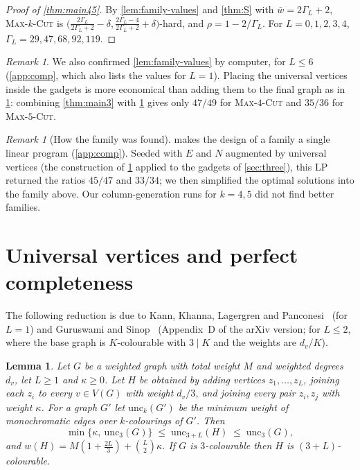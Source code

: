 \documentclass[11pt,letterpaper]{article}
\newtheorem{lemma}[theorem]{Lemma}
\theoremstyle{remark}
\newtheorem{remark}[theorem]{Remark}
\newcommand{\MC}[1]{\textup{\textsc{Max-$#1$-Cut}}}
\begin{document}
\begin{proof}[Proof of \cref{thm:main45}]
By \cref{lem:family-values} and \cref{thm:S} with $\bar w=2\Gamma_L+2$, \MC{k} is
$\big(\frac{2\Gamma_L}{2\Gamma_L+2}-\delta,\frac{2\Gamma_L-4}{2\Gamma_L+2}+\delta\big)$-hard, and
$\rho=1-2/\Gamma_L$. For $L=0,1,2,3,4$, $\Gamma_L=29,47,68,92,119$.
\end{proof}

\begin{remark}\label{rem:larger-k}
We also confirmed \cref{lem:family-values} by computer, for $L\le 6$ (\cref{app:comp}, which also lists
the values for $L=1$). Placing the universal vertices inside the gadgets is more economical than adding
them to the final graph as in \cref{sec:universal}: combining \cref{thm:main3} with \cref{lem:universal}
gives only $47/49$ for \MC{4} and $35/36$ for \MC{5}.
\end{remark}

\begin{remark}[How the family was found]
 makes the design of a family a single linear program (\cref{app:comp}). Seeded with $E$ and
$N$ augmented by universal vertices (the construction of \cref{sec:universal} applied to the gadgets of
\cref{sec:three}), this LP returned the ratios $45/47$ and $33/34$; we then simplified the optimal solutions
into the family above. Our column-generation runs for $k=4,5$ did not find better families.
\end{remark}

\section{Universal vertices and perfect completeness}\label{sec:universal}

The following reduction is due to Kann, Khanna, Lagergren and Panconesi~\cite[Sec.~3]{KKLP97} (for $L=1$)
and Guruswami and Sinop~\cite[Sec.~2.3]{GS13} (Appendix~D of the arXiv version; for $L\le 2$, where the base
graph is $K$-colourable with $3\mid K$ and the weights are $d_v/K$).

\begin{lemma}\label{lem:universal}
Let $G$ be a weighted graph with total weight $M$ and weighted degrees $d_v$, let $L\ge1$ and $\kappa\ge 0$.
Let $H$ be obtained by adding vertices $z_1,\dots,z_L$, joining each $z_i$ to every $v\in V(G)$ with
weight $d_v/3$, and joining every pair $z_i,z_j$ with weight $\kappa$. For a graph $G'$ let
$\mathrm{unc}_k(G')$ be the minimum weight of monochromatic edges over $k$-colourings of $G'$. Then
\[
  \min\{\kappa,\ \mathrm{unc}_3(G)\} \;\le\; \mathrm{unc}_{3+L}(H) \;\le\; \mathrm{unc}_3(G),
\]
and $w(H)=M(1+\frac{2L}3)+\binom L2\kappa$. If $G$ is $3$-colourable then $H$ is $(3+L)$-colourable.
\end{lemma}
\end{document}

